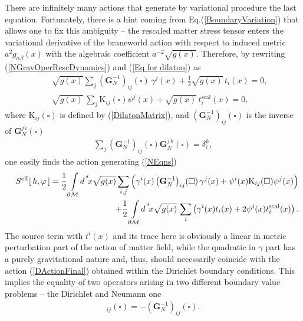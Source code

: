 \documentclass[a4paper,12pt]{article}
\newcommand{\ddim}{{d}}
\newcommand{\dM}{{\partial \cal M}}
\newcommand{\dx}{{d^{^{\,\ddim}} \!x}}
\newcommand{\bBox}{\square}  %
\newcommand{\nGrDn}{\overrightarrow{\mathrm{W}}\mathbf{G}_{D}\overleftarrow{\mathrm{W}}} %
\newcommand{\rnGrDnr}{{\nGrDn}} %
\begin{document}
There are infinitely many actions that generate by variational
procedure the last equation. Fortunately, there is a hint coming
from Eq.(\ref{BoundaryVariation}) that allows one to fix this
ambiguity -- the rescaled matter stress tensor enters the
variational derivative of the braneworld action with respect to
induced metric $a^2 g_{\alpha\beta}(x)$  with the algebraic
coefficient $a^{-2}\sqrt{g(x)}$. Therefore, by rewriting
(\ref{NGravOperRescDynamics}) and (\ref{Eq for dilaton}) as
    \begin{eqnarray}
     &&\sqrt{g(x)}\sum_j
     \left({\mathbf G}^{-1}_N\right)_{ij}(\bBox)\,
     \gamma^j(x)+\frac12\sqrt{g(x)}\,t_i(x)=0,     \nonumber\\
     &&\sqrt{g(x)}\,\sum_j
     \mathrm{K}_{ij}(\bBox)\psi^j(x)+
     \sqrt{g(x)}\, t_i^{\mathrm{scal}}(x)=0,       \label{NEqns}
    \end{eqnarray}
where $\mathrm{K}_{ij}(\bBox)$ is defined by
(\ref{DilatonMatrix}), and $\left({\mathbf
G}^{-1}_N\right)_{ij}\!(\bBox)$ is the inverse of ${\mathbf
G}^{j\,i}_N(\bBox)$
    \begin{eqnarray}
     \sum_j\left({\mathbf G}^{-1}_N\right)_{ij}\!(\bBox)
     {\mathbf G}^{j\,k}_N(\bBox)=\delta^k_i,
    \end{eqnarray}
one easily finds the action generating (\ref{NEqns})
    \begin{eqnarray}
     &&S^{\rm eff}[\,h,\varphi\,]= \frac12\int
     \limits_{\dM}\!\dx \sqrt{g(x)}\sum_{i,j}\left(
     \gamma^i(x)
     \left({\mathbf G}^{-1}_N\right)_{ij}\!(\bBox)\,
     \gamma^j(x)+\psi^i(x) \mathrm{K}_{ij}(\bBox)
     \psi^j(x) \right)                          \nonumber\\
     &&\qquad\qquad\qquad\qquad+
     \frac12\int\limits_{\dM}\!\dx \sqrt{g(x)}\,
     \sum_i\left(\gamma^i(x)t_i(x)
     +2\psi^i(x)
     t_i^{\mathrm{scal}}(x)\right).      \label{NActionFinal}
    \end{eqnarray}
The source term with $t^i(x)$ and its trace here is obviously a
linear in metric perturbation part of the action of matter field,
while the quadratic in $\gamma$ part has a purely gravitational
nature and, thus, should necessarily coincide with the action
(\ref{DActionFinal}) obtained within the Dirichlet boundary
conditions. This implies the equality of two operators arising in
two different boundary value problems -- the Dirichlet and Neumann
one
    \begin{eqnarray}
     [{\rnGrDnr}]_{ij}(\bBox)= -
    \left({\mathbf G}^{-1}_N\right)_{ij}(\bBox). \label{Relation}
    \end{eqnarray}
\end{document}
